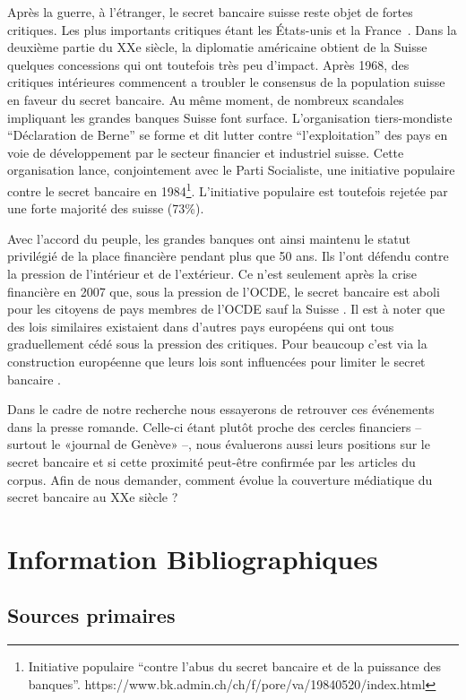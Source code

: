 \documentclass[11pt]{article}
\begin{document}
Après la guerre, à l'étranger, le secret bancaire suisse reste objet de fortes
critiques. Les plus importants critiques étant les États-unis et la
France~\citep[p. 503]{Mazbouri12}. Dans la deuxième partie du XXe siècle, la
diplomatie américaine obtient de la Suisse quelques concessions qui ont
toutefois très peu d'impact. Après 1968, des critiques intérieures commencent a
troubler le consensus de la population suisse en faveur du secret bancaire. Au
même moment, de nombreux scandales impliquant les grandes banques Suisse font
surface. L’organisation tiers-mondiste “Déclaration de Berne” \citep{EvB} se
forme et dit lutter contre ``l'exploitation'' des pays en voie de développement
par le secteur financier et industriel suisse. Cette organisation lance,
conjointement avec le Parti Socialiste, une initiative populaire contre le
secret bancaire en 1984\footnote{Initiative populaire ``contre l'abus du secret
bancaire et de la puissance des banques''.
https://www.bk.admin.ch/ch/f/pore/va/19840520/index.html}. L'initiative
populaire est toutefois rejetée par une forte majorité des suisse (73\%).

Avec l'accord du peuple, les grandes banques ont ainsi maintenu le
statut privilégié de la place financière pendant plus que 50 ans. Ils l’ont
défendu contre la pression de l’intérieur et de l’extérieur. Ce n’est
seulement après la crise financière en 2007 que, sous la pression de l'OCDE,
le secret bancaire est aboli pour les citoyens de pays membres de l'OCDE 
sauf la Suisse \citep{NeufVies}.
Il est à noter que des lois similaires existaient dans d'autres pays européens
qui ont tous graduellement cédé sous la pression des critiques. Pour beaucoup
c'est via la construction européenne que leurs lois sont influencées pour 
limiter le secret bancaire \citep[p. 32]{Palan09}. 

Dans le cadre de notre recherche nous essayerons de retrouver ces événements
dans la presse romande. Celle-ci étant plutôt proche des cercles financiers –
surtout le «journal de Genève» \citep{ConfClass1} –, nous évaluerons aussi
leurs positions sur le secret bancaire et si cette proximité peut-être
confirmée par les articles du corpus. Afin de nous demander, comment évolue la
couverture médiatique du secret bancaire au XXe siècle ? 

\section{Information Bibliographiques}
\subsection{Sources primaires}
\end{document}
